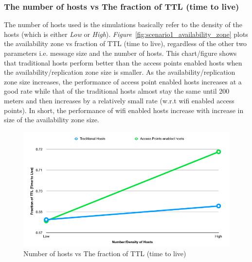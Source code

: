 {\subsubsection{The number of hosts vs The fraction of TTL (time to live)}
The number of hosts used is the simulations basically refer to the density of the hosts (which is either \textit{Low} or \textit{High}). \emph{Figure}~\ref{fig:scenario1_availability_zone} plots the availability zone vs fraction of TTL (time to live), regardless of the other two parameters i.e. message size and the number of hosts. This chart/figure shows that traditional hosts perform better than the access points enabled hosts when the availability/replication zone size is smaller. As the availability/replication zone size increases, the performance of access point enabled hosts increases at a good rate while that of the traditional hosts almost stay the same until 200 meters and then increases by a relatively small rate (w.r.t wifi enabled access points). In short, the performance of wifi enabled hosts increase with increase in size of the availability zone size.
\begin{figure}[h]
  \centering
  \includegraphics[scale=0.5]{./figures/scenario1_hosts_count}
  \caption{Number of hosts vs The fraction of TTL (time to live)}
  \label{fig:scenario1_number_of_hosts}
\end{figure}
\newpage
\vspace{3mm}
}

